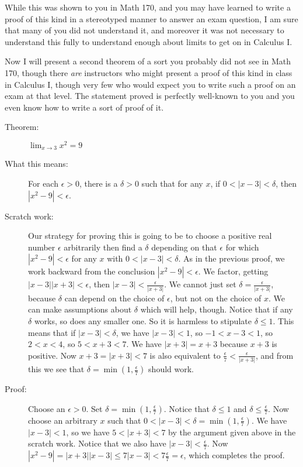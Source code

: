 \documentclass[12pt]{article}
\begin{document}
While this was shown to you in Math 170, and you may have learned to write a proof of this kind in a stereotyped manner to answer an exam question, I am sure that many of you did not understand it, and moreover it was not necessary to understand this fully to understand enough about limits to get on in Calculus I.

Now I will present a second theorem of a sort you probably did not see in Math 170, though there {\em are\/} instructors who might present a proof of this kind in class in Calculus I, though very few who would expect you to write such a proof on an exam at that level.  The statement proved is perfectly well-known to you and you even know how to write a sort of proof of it.

\begin{description}

\item[Theorem:]  $\lim_{x \rightarrow 3}x^2=9$

\item[What this means:]  For each $\epsilon>0$, there is a $\delta>0$ such that for any $x$, if $0<|x-3|<\delta$, then $|x^2-9|<\epsilon$.

\item[Scratch work:]  Our strategy for proving this is going to be to choose a positive real number $\epsilon$ arbitrarily then find a $\delta$ depending on that $\epsilon$ for which $|x^2-9|<\epsilon$ for any $x$ with $0<|x-3|<\delta$.  As in the previous proof, we work backward from the conclusion $|x^2-9|<\epsilon$.  We factor, getting $|x-3||x+3|<\epsilon$, then $|x-3|<\frac{\epsilon}{|x+3|}$.  We cannot just set  $\delta =\frac{\epsilon}{|x+3|}$,
because $\delta$ can depend on the choice of $\epsilon$, but not on the choice of $x$.  We can make assumptions about $\delta$ which will help, though.  Notice that if any $\delta$ works, so does any smaller one.  So it is harmless to stipulate $\delta\leq 1$.  This means that if $|x-3|<\delta$, we have $|x-3|<1$, so $-1<x-3<1$, so $2<x<4$, so $5<x+3<7$.  We have $|x+3|=x+3$ because $x+3$ is positive.  Now  $x+3=|x+3|<7$
is also equivalent to $\frac{\epsilon}7 < \frac{\epsilon}{|x+3|}$, and from this we see that $\delta = \min(1,\frac{\epsilon}7)$ should work.

\item[Proof:]  Choose an $\epsilon>0$.  Set $\delta = \min(1,\frac{\epsilon}7)$.  Notice that $\delta\leq 1$ and $\delta \leq \frac{\epsilon}7$. %
Now choose an arbitrary $x$ such that $0<|x-3|<\delta=\min(1,\frac{\epsilon}7)$.  We have $|x-3|<1$, so we have $5<|x+3|<7$ by
the argument given above in the scratch work. Notice that we also have $|x-3|<\frac{\epsilon}7$.   Now $|x^2-9| = |x+3||x-3| \leq 7|x-3| < 7\frac{\epsilon}7=\epsilon$, which completes the proof.

\end{description}
\end{document}
